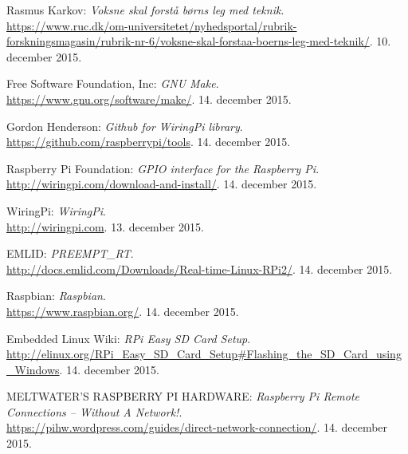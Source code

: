 \begin{thebibliography}{2}
 Rasmus Karkov: \textit{Voksne skal forstå børns leg med teknik}. \\
\url{https://www.ruc.dk/om-universitetet/nyhedsportal/rubrik-forskningsmagasin/rubrik-nr-6/voksne-skal-forstaa-boerns-leg-med-teknik/}. 10. december 2015.

 Free Software Foundation, Inc: \textit{GNU Make}. \\
\url{https://www.gnu.org/software/make/}. 14. december 2015.

 Gordon Henderson: \textit{Github for WiringPi library}. \\
\url{https://github.com/raspberrypi/tools}. 14. december 2015.

 Raspberry Pi Foundation: \textit{GPIO interface for the Raspberry Pi}. \\
\url{http://wiringpi.com/download-and-install/}. 14. december 2015.

 WiringPi: \textit{WiringPi}. \\
\url{http://wiringpi.com}. 13. december 2015.

 EMLID: \textit{PREEMPT\_RT}. \\
\url{http://docs.emlid.com/Downloads/Real-time-Linux-RPi2/}. 14. december 2015.

 Raspbian: \textit{Raspbian}. \\
\url{https://www.raspbian.org/}. 14. december 2015.

 Embedded Linux Wiki: \textit{RPi Easy SD Card Setup}. \\
\url{http://elinux.org/RPi_Easy_SD_Card_Setup#Flashing_the_SD_Card_using_Windows}. 14. december 2015.

 MELTWATER'S RASPBERRY PI HARDWARE: \textit{Raspberry Pi Remote Connections – Without A Network!}. \\
\url{https://pihw.wordpress.com/guides/direct-network-connection/}. 14. december 2015.

\end{thebibliography}
